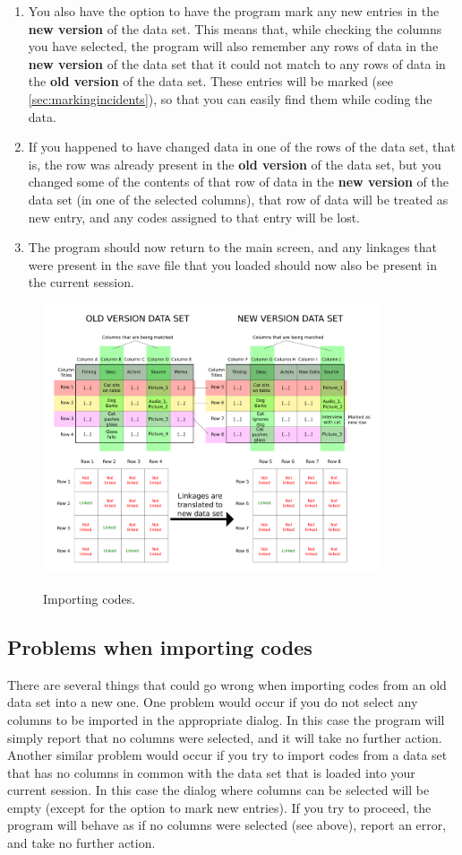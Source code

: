 \documentclass{memoir}
\begin{document}
\begin{enumerate}
\item{You also have the option to have the program mark any new entries in the \textbf{new version} of the data set. This means that, while checking the columns you have selected, the program will also remember any rows of data in the \textbf{new version} of the data set that it could not match to any rows of data in the \textbf{old version} of the data set. These entries will be marked (see \ref{sec:markingincidents}), so that you can easily find them while coding the data.}
\item{If you happened to have changed data in one of the rows of the data set, that is, the row was already present in the \textbf{old version} of the data set, but you changed some of the contents of that row of data in the \textbf{new version} of the data set (in one of the selected columns), that row of data will be treated as new entry, and any codes assigned to that entry will be lost.}
\item{The program should now return to the main screen, and any linkages that were present in the save file that you loaded should now also be present in the current session.}
\end{enumerate}

\begin{figure}[h!]
  \centering
  \caption{Importing codes.}
  \includegraphics[width=100mm]{Diagram_1.pdf}
  \label{fig:importingcodesdiagram}
\end{figure}

\subsection{Problems when importing codes}
\label{sec:problemsimportingcodes}

There are several things that could go wrong when importing codes from an old data set into a new one. One problem would occur if you do not select any columns to be imported in the appropriate dialog. In this case the program will simply report that no columns were selected, and it will take no further action. Another similar problem would occur if you try to import codes from a data set that has no columns in common with the data set that is loaded into your current session. In this case the dialog where columns can be selected will be empty (except for the option to mark new entries). If you try to proceed, the program will behave as if no columns were selected (see above), report an error, and take no further action.
\end{document}
